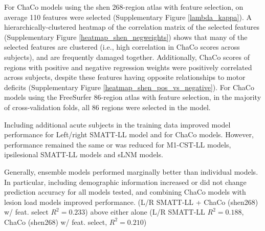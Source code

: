 \documentclass[10pt]{article}
\begin{document}
For ChaCo models using the shen 268-region atlas with feature selection, on average 110 features were selected (Supplementary Figure \ref{lambda_kappa}). A hierarchically-clustered heatmap of the correlation matrix of the selected features (Supplementary Figure \ref{heatmap_shen_negweights}) shows that many of the selected features are clustered (i.e., high correlation in ChaCo scores across subjects), and are frequently damaged together. Additionally, ChaCo scores of regions with positive and negative regression weights were positively correlated across subjects, despite these features having opposite relationships to motor deficits (Supplementary Figure \ref{heatmap_shen_pos_vs_negative}). For ChaCo models using the FreeSurfer 86-region atlas with feature selection, in the majority of cross-validation folds, all 86 regions were selected in the model. 

Including additional acute subjects in the training data improved model performance for Left/right SMATT-LL model and for ChaCo models. However, performance remained the same or was reduced for M1-CST-LL models, ipsilesional SMATT-LL models and sLNM models.

Generally, ensemble models performed marginally better than individual models. In particular, including demographic information increased or did not change prediction accuracy for all models tested, and combining ChaCo models with lesion load models improved performance. (L/R SMATT-LL + ChaCo (shen268) w/ feat. select $R^2 = 0.233$) above either alone (L/R SMATT-LL $R^2=0.188$, ChaCo (shen268) w/ feat. select, $R^2=0.210$)

\newpage 
\end{document}
